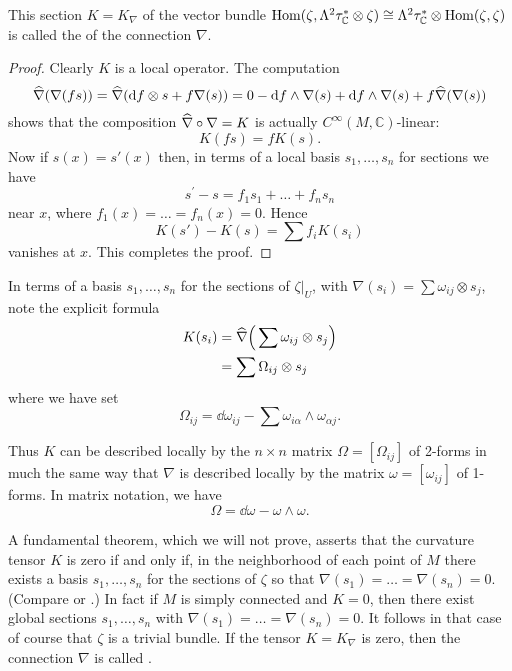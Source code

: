 \documentclass[../main]{subfiles}
\begin{document}
\begin{definition}
This section $K=K_{\nabla}$ of the vector bundle \newline $\operatorname{Hom}(\zeta, \Lambda^{2} \tau_{\mathbb{C}}^{*} \otimes \zeta) \cong \Lambda^{2} \tau_{\mathbb{C}}^{*} \otimes \operatorname{Hom}(\zeta, \zeta)$ is called the  of the connection $\nabla$.
\end{definition}

\begin{proof}
Clearly $K$ is a local operator. The computation
\[
\xhat{\nabla}(\nabla(fs))=\xhat{\nabla}(\dd f \otimes s+f \nabla(s))=0-\dd f \wedge \nabla(s)+\dd f \wedge \nabla(s)+f \xhat{\nabla}(\nabla(s))
\]
 shows that the composition $\xhat{\nabla} \circ \nabla=K$ is actually $C^\infty (M, \mathbb{C})$-linear:
\[
K(fs)=fK(s).
\]
Now if $s(x)=s'(x)$ then, in terms of a local basis $s_{1}, \ldots, s_{n}$ for sections we have
\[
s^{\prime}-s=f_{1} s_{1}+\ldots+f_{n} s_{n}
\]
near $x$, where $f_{1}(x)=\ldots=f_{n}(x)=0$. Hence
\[
K(s')-K(s)=\sum f_{i} K(s_{i})
\]
vanishes at $x$. This completes the proof.
\end{proof}

In terms of a basis $s_{1}, \ldots, s_{n}$ for the sections of $\zeta |_U$, with $\nabla(s_{i})= \sum \omega_{i j} \otimes s_{j}$, note the explicit formula
\[
\begin{aligned}
K(s_{i}) &=\xhat{\nabla}\Big( \sum \omega_{ij} \otimes s_{j}\Big) \\
&=\sum \Omega_{ij} \otimes s_{j}
\end{aligned}
\]
where we have set
\[
\Omega_{ij}=\dd \omega_{ij}-\sum \omega_{i\alpha} \wedge \omega_{\alpha j}.
\]

Thus $K$ can be described locally by the $n \times n$ matrix $\Omega=[\Omega_{ij}]$ of 2-forms in much the same way that $\nabla$ is described locally by the matrix $\omega=[\omega_{i j}]$ of 1-forms. In matrix notation, we have
\[
\Omega=\dd \omega-\omega \wedge \omega .
\]

A fundamental theorem, which we will not prove, asserts that the curvature tensor $K$ is zero if and only if, in the neighborhood of each point of $M$ there exists a basis $s_{1}, \ldots, s_{n}$ for the sections of $\zeta$ so that $\nabla(s_{1})=\ldots=\nabla(s_{n})=0$. (Compare \cite{bishop2011} or \cite{kobayashi1963foundations}.) In fact if $M$ is simply connected and $K=0$, then there exist global sections $s_{1}, \ldots, s_{n}$ with $\nabla(s_{1})=\ldots=\nabla(s_{n})=0$. It follows in that case of course that $\zeta$ is a trivial bundle. If the tensor $K=K_{\nabla}$ is zero, then the connection $\nabla$ is called .
\end{document}
